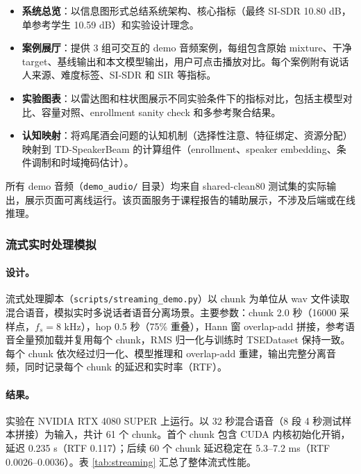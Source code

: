 \documentclass[UTF8,zihao=5,a4paper]{ctexart}
\begin{document}
\begin{itemize}
    \item \textbf{系统总览}：以信息图形式总结系统架构、核心指标（最终 SI-SDR 10.80 dB，单参考学生 10.59 dB）和实验设计理念。
    \item \textbf{案例展厅}：提供 3 组可交互的 demo 音频案例，每组包含原始 mixture、干净 target、基线输出和本文模型输出，用户可点击播放对比。每个案例附有说话人来源、难度标签、SI-SDR 和 SIR 等指标。
    \item \textbf{实验图表}：以雷达图和柱状图展示不同实验条件下的指标对比，包括主模型对比、容量对照、enrollment sanity check 和多参考聚合结果。
    \item \textbf{认知映射}：将鸡尾酒会问题的认知机制（选择性注意、特征绑定、资源分配）映射到 TD-SpeakerBeam 的计算组件（enrollment、speaker embedding、条件调制和时域掩码估计）。
\end{itemize}

所有 demo 音频（\texttt{demo\_audio/} 目录）均来自 shared-clean80 测试集的实际输出，展示页面可离线运行。该页面服务于课程报告的辅助展示，不涉及后端或在线推理。

\subsubsection{流式实时处理模拟}

\paragraph{设计。}
流式处理脚本（\texttt{scripts/streaming\_demo.py}）以 chunk 为单位从 wav 文件读取混合语音，模拟实时多说话者语音分离场景。主要参数：chunk 2.0 秒（16000 采样点，$f_s = 8$ kHz），hop 0.5 秒（75\% 重叠），Hann 窗 overlap-add 拼接，参考语音全量预加载并复用每个 chunk，RMS 归一化与训练时 TSEDataset 保持一致。每个 chunk 依次经过归一化、模型推理和 overlap-add 重建，输出完整分离音频，同时记录每个 chunk 的延迟和实时率（RTF）。

\paragraph{结果。}
实验在 NVIDIA RTX 4080 SUPER 上运行。以 32 秒混合语音（8 段 4 秒测试样本拼接）为输入，共计 61 个 chunk。首个 chunk 包含 CUDA 内核初始化开销，延迟 0.235 s（RTF 0.117）；后续 60 个 chunk 延迟稳定在 5.3--7.2 ms（RTF 0.0026--0.0036）。表 \ref{tab:streaming} 汇总了整体流式性能。
\end{document}
